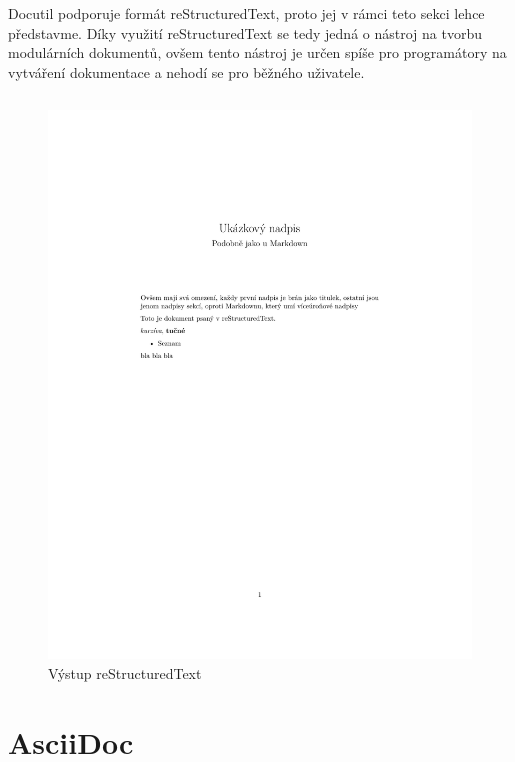Docutil podporuje formát reStructuredText, proto jej v rámci teto sekci lehce představme.
 \cite{docutil}
Díky využití reStructuredText se tedy jedná o nástroj na tvorbu modulárních dokumentů, ovšem tento nástroj je určen spíše pro programátory na vytváření dokumentace a nehodí se
pro běžného uživatele.

\inputminted{rst}{example-rst.rst}

\begin{figure}[h]
    \centering
    \includegraphics[width=\textwidth]{example-rst.pdf}
    \caption{Výstup reStructuredText}
    \label{fig:rstOutput}
\end{figure}

\section{AsciiDoc}


